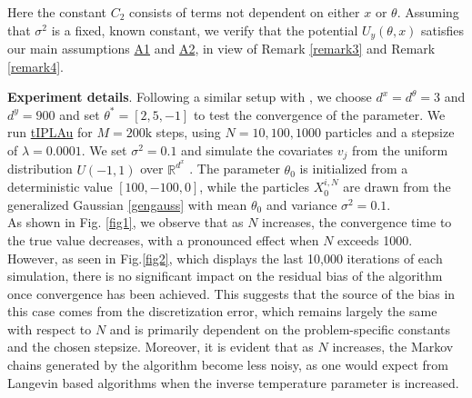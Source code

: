 \documentclass[a4paper, 10pt]{article}
\theoremstyle{plain}%
\begin{document}
Here the constant $C_2$ consists of terms not dependent on either $x$ or $\theta$. Assuming that $\sigma^2$ is a fixed, known constant, we verify that the potential $ U_y(\theta,x)$ satisfies our main assumptions \hyperlink{Assum1}{A1} and \hyperlink{Assum2}{A2}, in view of Remark \ref{remark3} and Remark \ref{remark4}.\newline \par \noindent \textbf{Experiment details}. Following a similar setup with \cite{Ipla}, we choose $d^x = d^{\theta} = 3$ and $d^y = 900$ and set $\theta^* = [2, 5, -1]$ to test the convergence of the parameter. We run \hyperref[algo1]{tIPLAu} for $M = 200\text{k}$ steps, using $N = 10, 100, 1000$ particles and a stepsize of $\lambda = 0.0001$. We set $\sigma^2 = 0.1$ and simulate the covariates $v_j$ from the uniform distribution $U(-1,1)$ over $\mathbb{R}^{d^x}$ . The parameter ${\theta}_0$ is initialized from a deterministic value $[100, -100, 0]$, while the particles $X^{i,N}_0$ are drawn from the generalized Gaussian \eqref{gengauss} with mean $\theta_0$ and variance $\sigma^2=0.1$.\\
\indent As shown in Fig. \ref{fig1}, we observe that as $N$ increases, the convergence time to the true value decreases, with a pronounced effect when $N$ exceeds 1000. However, as seen in Fig.\ref{fig2}, which displays the last 10,000 iterations of each simulation, there is no significant impact on the residual bias of the algorithm once convergence has been achieved. This suggests that the source of the bias in this case comes from the discretization error, which remains largely the same with respect to $N$ and is primarily dependent on the problem-specific constants and the chosen stepsize. Moreover, it is evident that as $N$ increases, the Markov chains generated by the algorithm become less noisy, as one would expect from Langevin based algorithms when the inverse temperature parameter is increased. 
\end{document}

